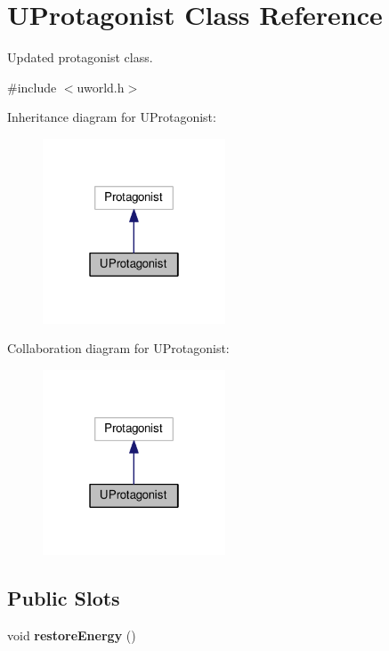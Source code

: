 \hypertarget{classUProtagonist}{}\section{U\+Protagonist Class Reference}
\label{classUProtagonist}


Updated protagonist class.  




{\ttfamily \#include $<$uworld.\+h$>$}



Inheritance diagram for U\+Protagonist\+:\nopagebreak
\begin{figure}[H]
\begin{center}
\leavevmode
\includegraphics[width=154pt]{d8/da2/classUProtagonist__inherit__graph}
\end{center}
\end{figure}


Collaboration diagram for U\+Protagonist\+:\nopagebreak
\begin{figure}[H]
\begin{center}
\leavevmode
\includegraphics[width=154pt]{df/d4d/classUProtagonist__coll__graph}
\end{center}
\end{figure}
\subsection*{Public Slots}
\begin{DoxyCompactItemize}
\item 
void {\bfseries restore\+Energy} ()\hypertarget{classUProtagonist_aafceebba330665d6c8cf6943515526d5}{}\label{classUProtagonist_aafceebba330665d6c8cf6943515526d5}

\end{DoxyCompactItemize}
